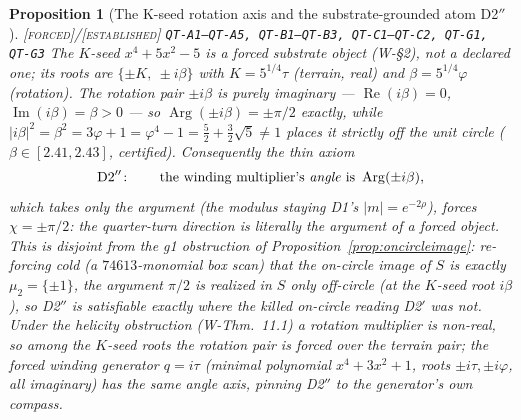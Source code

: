 \documentclass[11pt]{article}
\newcommand{\tagF}{\textcolor{cF}{\textsc{[forced]}}}
\newcommand{\tagE}{\textcolor{cE}{\textsc{[established]}}}
\newcommand{\hx}[1]{\textcolor{cC}{\footnotesize\texttt{#1}}}
\newcommand{\gp}{\varphi}
\DeclareMathOperator{\Arg}{Arg}
\DeclareMathOperator{\Rea}{Re}
\DeclareMathOperator{\Ima}{Im}
\theoremstyle{plain}
\newtheorem{proposition}[theorem]{Proposition}
\theoremstyle{definition}
\theoremstyle{remark}
\begin{document}
\begin{proposition}[The K-seed rotation axis and the substrate-grounded atom D2$''$]\label{prop:d2reloc}\tagF{}/\tagE{} \hx{QT-A1--QT-A5, QT-B1--QT-B3, QT-C1--QT-C2, QT-G1, QT-G3}
The $K$-seed $x^4+5x^2-5$ is a \emph{forced} substrate object (W-\S2), not a
declared one; its roots are $\{\pm K,\ \pm i\beta\}$ with $K=5^{1/4}\tau$
(terrain, real) and $\beta=5^{1/4}\gp$ (rotation). The rotation pair $\pm i\beta$
is purely imaginary --- $\Rea(i\beta)=0$, $\Ima(i\beta)=\beta>0$ --- so
$\Arg(\pm i\beta)=\pm\pi/2$ \emph{exactly}, while $|i\beta|^2=\beta^2=3\gp+1
=\gp^4-1=\tfrac52+\tfrac32\sqrt5\neq1$ places it strictly off the unit circle
($\beta\in[2.41,2.43]$, certified). Consequently the thin axiom
\[
\text{D2}''\colon\qquad
\text{the winding multiplier's \emph{angle} is }\Arg(\pm i\beta),
\]
which takes only the argument (the modulus staying D1's $|m|=e^{-2\rho}$),
\emph{forces} $\chi=\pm\pi/2$: the quarter-turn \emph{direction} is literally the
argument of a forced object. This is \emph{disjoint} from the g1 obstruction of
Proposition~\ref{prop:oncircleimage}: re-forcing cold (a $74613$-monomial box
scan) that the on-circle image of $S$ is exactly $\mu_2=\{\pm1\}$, the argument
$\pi/2$ is realized in $S$ only \emph{off-circle} (at the $K$-seed root
$i\beta$), so D2$''$ is satisfiable exactly where the killed on-circle reading
D2$'$ was not. Under the helicity obstruction (W-Thm.~11.1) a rotation
multiplier is non-real, so among the $K$-seed roots the rotation pair is forced
over the terrain pair; the forced winding generator $q=i\tau$ (minimal
polynomial $x^4+3x^2+1$, roots $\pm i\tau,\pm i\gp$, all imaginary) has the same
angle axis, pinning D2$''$ to the generator's own compass.
\end{proposition}
\end{document}

